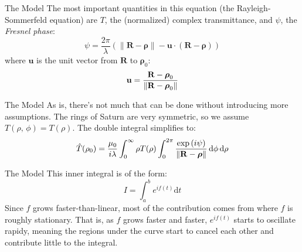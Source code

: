 \documentclass{beamer}
\begin{document}
    \begin{frame}{The Model}
        The most important quantities in this equation
        (the Rayleigh-Sommerfeld equation) are $T$, the (normalized) complex
        transmittance, and $\psi$, the \textit{Fresnel phase}:
        \begin{equation}
            \psi
            =
            \frac{2\pi}{\lambda}
            \left(
                \|\mathbf{R}-\boldsymbol{\rho}\|
                -
                \mathbf{u}\cdot\left(
                    \mathbf{R}-\boldsymbol{\rho}
                \right)
            \right)
        \end{equation}
        where $\mathbf{u}$ is the unit vector from $\mathbf{R}$ to
        $\boldsymbol{\rho}_{0}$:
        \begin{equation}
            \mathbf{u}
            =
            \frac{%
                \mathbf{R}-\boldsymbol{\rho}_{0}%
            }{%
                \|\mathbf{R}-\boldsymbol{\rho}_{0}\|%
            }
        \end{equation}
    \end{frame}
    \begin{frame}{The Model}
        As is, there's not much that can be done without introducing more
        assumptions. The rings of Saturn are very symmetric, so we assume
        $T(\rho,\,\phi)=T(\rho)$. The double integral simplifies to:
        \begin{equation}
            \hat{T}(\rho_{0})
            =
            \frac{\mu_{0}}{i\lambda}
            \int_{0}^{\infty}
                \rho{T}(\rho)
                \int_{0}^{2\pi}
                    \frac{%
                        \exp\left(i\psi\right)
                    }{%
                        \|\mathbf{R}-\boldsymbol{\rho}\|
                    }\,\textrm{d}\phi\,\textrm{d}\rho
        \end{equation}
    \end{frame}
    \begin{frame}{The Model}
        This inner integral is of the form:
        \begin{equation}
            I
            =
            \int_{a}^{b}
                e^{if(t)}\textrm{d}t
        \end{equation}
        Since $f$ grows faster-than-linear, most of the contribution comes
        from where $f$ is roughly stationary. That is, as $f$ grows
        faster and faster, $e^{if(t)}$ starts to oscillate rapidy, meaning
        the regions under the curve start to cancel each other and
        contribute little to the integral.
    \end{frame}
\end{document}
